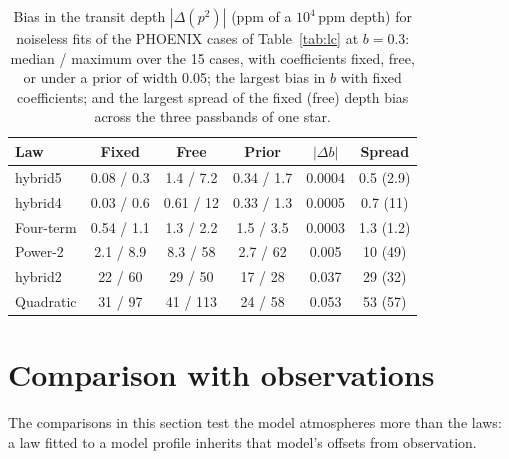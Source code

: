 \documentclass{aa}
\newcommand{\ppm}{\,\textrm{ppm}}
\begin{document}
\begin{table}
\caption{Bias in the transit depth $|\Delta(p^2)|$ (ppm of a $10^4\ppm$ depth)
for noiseless fits of the PHOENIX cases of Table~\ref{tab:lc} at $b=0.3$:
median / maximum over the 15 cases, with coefficients fixed, free, or under a
prior of width 0.05; the largest bias in $b$ with fixed coefficients; and the
largest spread of the fixed (free) depth bias across the three passbands of one
star.}
\label{tab:bias}
\centering
\small
\setlength{\tabcolsep}{2.5pt}
\begin{tabular}{lccccc}
\hline\hline
Law & Fixed & Free & Prior & $|\Delta b|$ & Spread\\
\hline
hybrid5 & 0.08 / 0.3 & 1.4 / 7.2 & 0.34 / 1.7 & 0.0004 & 0.5 (2.9)\\
hybrid4 & 0.03 / 0.6 & 0.61 / 12 & 0.33 / 1.3 & 0.0005 & 0.7 (11)\\
Four-term & 0.54 / 1.1 & 1.3 / 2.2 & 1.5 / 3.5 & 0.0003 & 1.3 (1.2)\\
Power-2 & 2.1 / 8.9 & 8.3 / 58 & 2.7 / 62 & 0.005 & 10 (49)\\
hybrid2 & 22 / 60 & 29 / 50 & 17 / 28 & 0.037 & 29 (32)\\
Quadratic & 31 / 97 & 41 / 113 & 24 / 58 & 0.053 & 53 (57)\\
\hline
\end{tabular}
\end{table}

\section{Comparison with observations}\label{sec:obs}
The comparisons in this section test the model atmospheres more than the laws:
a law fitted to a model profile inherits that model's offsets from
observation.
\end{document}

